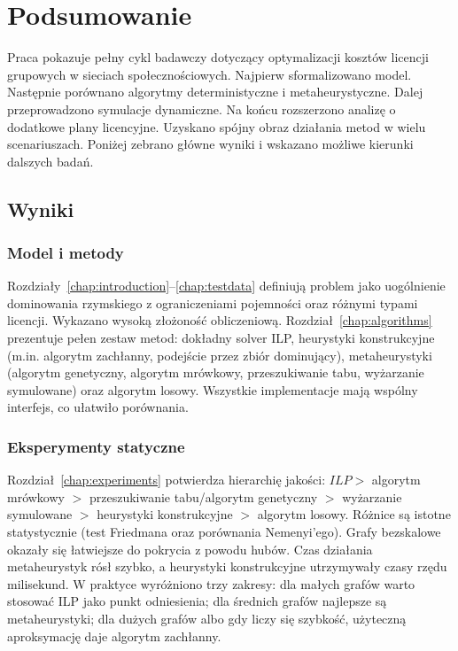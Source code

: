 \chapter{Podsumowanie}\label{chap:conclusion}

Praca pokazuje pełny cykl badawczy dotyczący optymalizacji kosztów licencji grupowych w sieciach społecznościowych. Najpierw sformalizowano model. Następnie porównano algorytmy deterministyczne i metaheurystyczne. Dalej przeprowadzono symulacje dynamiczne. Na końcu rozszerzono analizę o dodatkowe plany licencyjne. Uzyskano spójny obraz działania metod w wielu scenariuszach. Poniżej zebrano główne wyniki i wskazano możliwe kierunki dalszych badań.

\section{Wyniki}

\subsection{Model i metody}
Rozdziały~\ref{chap:introduction}--\ref{chap:testdata} definiują problem jako uogólnienie dominowania rzymskiego z ograniczeniami pojemności oraz różnymi typami licencji. Wykazano wysoką złożoność obliczeniową. Rozdział~\ref{chap:algorithms} prezentuje pełen zestaw metod: dokładny solver ILP, heurystyki konstrukcyjne (m.in. algorytm zachłanny, podejście przez zbiór dominujący), metaheurystyki (algorytm genetyczny, algorytm mrówkowy, przeszukiwanie tabu, wyżarzanie symulowane) oraz algorytm losowy. Wszystkie implementacje mają wspólny interfejs, co ułatwiło porównania.

\subsection{Eksperymenty statyczne}
Rozdział~\ref{chap:experiments} potwierdza hierarchię jakości: $ILP >$ algorytm mrówkowy $>$ przeszukiwanie tabu/algorytm genetyczny $>$ wyżarzanie symulowane $>$ heurystyki konstrukcyjne $>$ algorytm losowy. Różnice są istotne statystycznie (test Friedmana oraz porównania Nemenyi'ego). Grafy bezskalowe okazały się łatwiejsze do pokrycia z powodu hubów. Czas działania metaheurystyk rósł szybko, a heurystyki konstrukcyjne utrzymywały czasy rzędu milisekund. W praktyce wyróżniono trzy zakresy: dla małych grafów warto stosować ILP jako punkt odniesienia; dla średnich grafów najlepsze są metaheurystyki; dla dużych grafów albo gdy liczy się szybkość, użyteczną aproksymację daje algorytm zachłanny.

